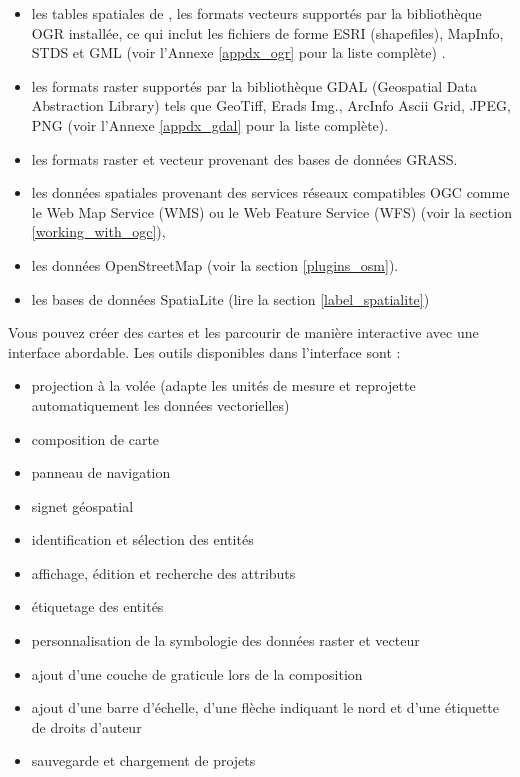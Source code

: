 \begin{itemize}[label=--]
\item les tables spatiales de \ppg, les formats vecteurs supportés par la bibliothèque OGR installée, ce qui inclut les fichiers de forme ESRI (shapefiles), MapInfo, STDS et GML (voir l'Annexe \ref{appdx_ogr} pour la liste complète) .
\item les formats raster supportés par la bibliothèque GDAL (Geospatial Data Abstraction Library) tels que GeoTiff, Erads Img., ArcInfo Ascii Grid, JPEG, PNG (voir l'Annexe \ref{appdx_gdal} pour la liste complète).

\item les formats raster et vecteur provenant des bases de données GRASS. 
\item les données spatiales provenant des services réseaux compatibles OGC comme le Web Map Service (WMS) ou le Web Feature Service (WFS) (voir la  section \ref{working_with_ogc}),
\item les données OpenStreetMap (voir la section \ref{plugins_osm}).

\item les bases de données SpatiaLite (lire la section \ref{label_spatialite}) 
\end{itemize}

Vous pouvez créer des cartes et les parcourir de manière interactive avec une interface abordable. Les outils disponibles dans l'interface sont :

\begin{itemize}[label=--]
\item projection à la volée (adapte les unités de mesure et reprojette automatiquement les données vectorielles)
\item composition de carte
\item panneau de navigation
\item signet géospatial
\item identification et sélection des entités
\item affichage, édition et recherche des attributs
\item étiquetage des entités
\item personnalisation de la symbologie des données raster et vecteur
\item ajout d'une couche de graticule lors de la composition
\item ajout d'une barre d'échelle, d'une flèche indiquant le nord et d'une étiquette de droits d'auteur
\item sauvegarde et chargement de projets
\end{itemize}

